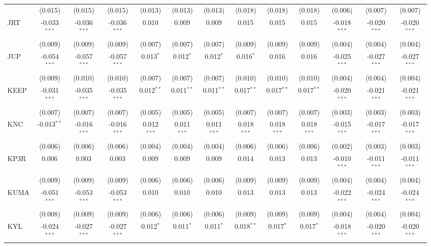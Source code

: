 \begin{table}[!htbp]
\begin{tabular}{@{\extracolsep{5pt}}lcccccccccccc}
  & (0.015) & (0.015) & (0.015) & (0.013) & (0.013) & (0.013) & (0.018) & (0.018) & (0.018) & (0.006) & (0.007) & (0.007) \\
 JRT & -0.033$^{***}$ & -0.036$^{***}$ & -0.036$^{***}$ & 0.010$^{}$ & 0.009$^{}$ & 0.009$^{}$ & 0.015$^{}$ & 0.015$^{}$ & 0.015$^{}$ & -0.018$^{***}$ & -0.020$^{***}$ & -0.020$^{***}$ \\
  & (0.009) & (0.009) & (0.009) & (0.007) & (0.007) & (0.007) & (0.009) & (0.009) & (0.009) & (0.004) & (0.004) & (0.004) \\
 JUP & -0.054$^{***}$ & -0.057$^{***}$ & -0.057$^{***}$ & 0.013$^{*}$ & 0.012$^{*}$ & 0.012$^{*}$ & 0.016$^{*}$ & 0.016$^{}$ & 0.016$^{}$ & -0.025$^{***}$ & -0.027$^{***}$ & -0.027$^{***}$ \\
  & (0.009) & (0.010) & (0.010) & (0.007) & (0.007) & (0.007) & (0.010) & (0.010) & (0.010) & (0.004) & (0.004) & (0.004) \\
 KEEP & -0.031$^{***}$ & -0.035$^{***}$ & -0.035$^{***}$ & 0.012$^{**}$ & 0.011$^{**}$ & 0.011$^{**}$ & 0.017$^{**}$ & 0.017$^{**}$ & 0.017$^{**}$ & -0.020$^{***}$ & -0.021$^{***}$ & -0.021$^{***}$ \\
  & (0.007) & (0.007) & (0.007) & (0.005) & (0.005) & (0.005) & (0.007) & (0.007) & (0.007) & (0.003) & (0.003) & (0.003) \\
 KNC & -0.013$^{**}$ & -0.016$^{***}$ & -0.016$^{***}$ & 0.012$^{***}$ & 0.011$^{***}$ & 0.011$^{***}$ & 0.018$^{***}$ & 0.018$^{***}$ & 0.018$^{***}$ & -0.015$^{***}$ & -0.017$^{***}$ & -0.017$^{***}$ \\
  & (0.006) & (0.006) & (0.006) & (0.004) & (0.004) & (0.004) & (0.006) & (0.006) & (0.006) & (0.002) & (0.003) & (0.003) \\
 KP3R & 0.006$^{}$ & 0.003$^{}$ & 0.003$^{}$ & 0.009$^{}$ & 0.009$^{}$ & 0.009$^{}$ & 0.014$^{}$ & 0.013$^{}$ & 0.013$^{}$ & -0.010$^{***}$ & -0.011$^{***}$ & -0.011$^{***}$ \\
  & (0.009) & (0.009) & (0.009) & (0.006) & (0.006) & (0.006) & (0.009) & (0.009) & (0.009) & (0.004) & (0.004) & (0.004) \\
 KUMA & -0.051$^{***}$ & -0.053$^{***}$ & -0.053$^{***}$ & 0.010$^{}$ & 0.010$^{}$ & 0.010$^{}$ & 0.013$^{}$ & 0.013$^{}$ & 0.013$^{}$ & -0.022$^{***}$ & -0.024$^{***}$ & -0.024$^{***}$ \\
  & (0.008) & (0.009) & (0.009) & (0.006) & (0.006) & (0.006) & (0.009) & (0.009) & (0.009) & (0.004) & (0.004) & (0.004) \\
 KYL & -0.024$^{***}$ & -0.027$^{***}$ & -0.027$^{***}$ & 0.012$^{*}$ & 0.011$^{*}$ & 0.011$^{*}$ & 0.018$^{**}$ & 0.017$^{*}$ & 0.017$^{*}$ & -0.018$^{***}$ & -0.020$^{***}$ & -0.020$^{***}$ \\

\end{tabular}
\end{table}
